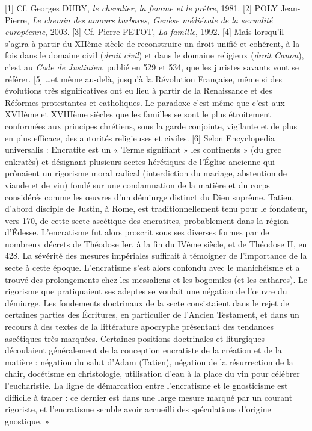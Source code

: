 [1] Cf. Georges DUBY,\emph{ le chevalier, la femme et le prêtre}, 1981.
[2] POLY Jean-Pierre, \emph{Le chemin des amours barbares, Genèse médiévale de la sexualité européenne}, 2003. 
[3] Cf. Pierre PETOT, \emph{La famille}, 1992. 
[4] Mais lorsqu'il s'agira à partir du XIIème siècle de reconstruire un droit unifié et cohérent, à la fois dans le domaine civil (\emph{droit civil}) et dans le domaine religieux (\emph{droit Canon}), c'est au \emph{Code de Justinien}, publié en 529 et 534, que les juristes savants vont se référer. 
[5] …et même au-delà, jusqu'à la Révolution Française, même si des évolutions très significatives ont eu lieu à partir de la Renaissance et des Réformes protestantes et catholiques. Le paradoxe c'est même que c'est aux XVIIème et XVIIIème siècles que les familles se sont le plus étroitement conformées aux principes chrétiens, sous la garde conjointe, vigilante et de plus en plus efficace, des autorités religieuses et civiles.
[6] Selon Encyclopedia universalis : Encratite est un « Terme signifiant » les continents » (du grec enkratès) et désignant plusieurs sectes hérétiques de l'Église ancienne qui prônaient un rigorisme moral radical (interdiction du mariage, abstention de viande et de vin) fondé sur une condamnation de la matière et du corps considérés comme les œuvres d'un démiurge distinct du Dieu suprême. Tatien, d'abord disciple de Justin, à Rome, est traditionnellement tenu pour le fondateur, vers 170, de cette secte ascétique des encratites, probablement dans la région d'Édesse. L'encratisme fut alors proscrit sous ses diverses formes par de nombreux décrets de Théodose Ier, à la fin du IVème siècle, et de Théodose II, en 428.
La sévérité des mesures impériales suffirait à témoigner de l'importance de la secte à cette époque. L'encratisme s'est alors confondu avec le manichéisme et a trouvé des prolongements chez les messaliens et les bogomiles (et les cathares). Le rigorisme que pratiquaient ses adeptes se voulait une négation de l'œuvre du démiurge. Les fondements doctrinaux de la secte consistaient dans le rejet de certaines parties des Écritures, en particulier de l'Ancien Testament, et dans un recours à des textes de la littérature apocryphe présentant des tendances ascétiques très marquées. Certaines positions doctrinales et liturgiques découlaient généralement de la conception encratiste de la création et de la matière : négation du salut d'Adam (Tatien), négation de la résurrection de la chair, docétisme en christologie, utilisation d'eau à la place du vin pour célébrer l'eucharistie. La ligne de démarcation entre l'encratisme et le gnosticisme est difficile à tracer : ce dernier est dans une large mesure marqué par un courant rigoriste, et l'encratisme semble avoir accueilli des spéculations d'origine gnostique. »
